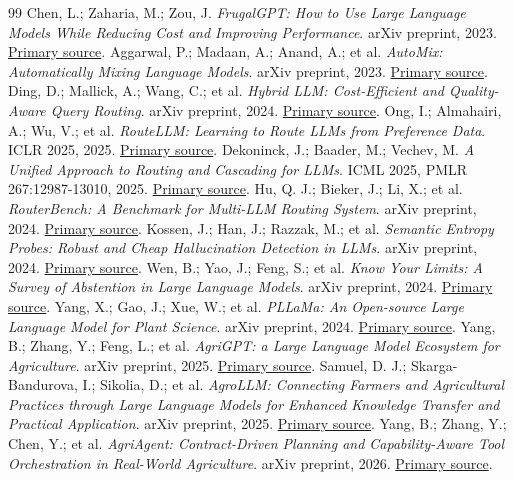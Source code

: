 \documentclass[10pt,a4paper]{article}
\begin{document}
\begin{thebibliography}{99}\small
{}Chen, L.; Zaharia, M.; Zou, J. \emph{FrugalGPT: How to Use Large Language Models While Reducing Cost and Improving Performance}. arXiv preprint, 2023. \href{https://arxiv.org/abs/2305.05176}{Primary source}.
Aggarwal, P.; Madaan, A.; Anand, A.; et al. \emph{AutoMix: Automatically Mixing Language Models}. arXiv preprint, 2023. \href{https://arxiv.org/abs/2310.12963}{Primary source}.
Ding, D.; Mallick, A.; Wang, C.; et al. \emph{Hybrid LLM: Cost-Efficient and Quality-Aware Query Routing}. arXiv preprint, 2024. \href{https://arxiv.org/abs/2404.14618}{Primary source}.
Ong, I.; Almahairi, A.; Wu, V.; et al. \emph{RouteLLM: Learning to Route LLMs from Preference Data}. ICLR 2025, 2025. \href{https://proceedings.iclr.cc/paper_files/paper/2025/hash/5503a7c69d48a2f86fc00b3dc09de686-Abstract-Conference.html}{Primary source}.
Dekoninck, J.; Baader, M.; Vechev, M. \emph{A Unified Approach to Routing and Cascading for LLMs}. ICML 2025, PMLR 267:12987-13010, 2025. \href{https://proceedings.mlr.press/v267/dekoninck25a.html}{Primary source}.
Hu, Q. J.; Bieker, J.; Li, X.; et al. \emph{RouterBench: A Benchmark for Multi-LLM Routing System}. arXiv preprint, 2024. \href{https://arxiv.org/abs/2403.12031}{Primary source}.
Kossen, J.; Han, J.; Razzak, M.; et al. \emph{Semantic Entropy Probes: Robust and Cheap Hallucination Detection in LLMs}. arXiv preprint, 2024. \href{https://arxiv.org/abs/2406.15927}{Primary source}.
Wen, B.; Yao, J.; Feng, S.; et al. \emph{Know Your Limits: A Survey of Abstention in Large Language Models}. arXiv preprint, 2024. \href{https://arxiv.org/abs/2407.18418}{Primary source}.
Yang, X.; Gao, J.; Xue, W.; et al. \emph{PLLaMa: An Open-source Large Language Model for Plant Science}. arXiv preprint, 2024. \href{https://arxiv.org/abs/2401.01600}{Primary source}.
Yang, B.; Zhang, Y.; Feng, L.; et al. \emph{AgriGPT: a Large Language Model Ecosystem for Agriculture}. arXiv preprint, 2025. \href{https://arxiv.org/abs/2508.08632}{Primary source}.
Samuel, D. J.; Skarga-Bandurova, I.; Sikolia, D.; et al. \emph{AgroLLM: Connecting Farmers and Agricultural Practices through Large Language Models for Enhanced Knowledge Transfer and Practical Application}. arXiv preprint, 2025. \href{https://arxiv.org/abs/2503.04788}{Primary source}.
Yang, B.; Zhang, Y.; Chen, Y.; et al. \emph{AgriAgent: Contract-Driven Planning and Capability-Aware Tool Orchestration in Real-World Agriculture}. arXiv preprint, 2026. \href{https://arxiv.org/abs/2601.08308}{Primary source}.

\end{thebibliography}
\end{document}
